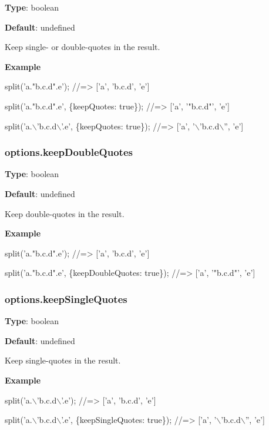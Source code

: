 {\bfseries Type}\+: {\ttfamily boolean}

{\bfseries Default}\+: {\ttfamily undefined}

Keep single-\/ or double-\/quotes in the result.

{\bfseries Example}


\begin{DoxyCode}
split('a."b.c.d".e');
//=> ['a', 'b.c.d', 'e']

split('a."b.c.d".e', \{keepQuotes: true\});
//=> ['a', '"b.c.d"', 'e']

split('a.\(\backslash\)'b.c.d\(\backslash\)'.e', \{keepQuotes: true\});
//=> ['a', '\(\backslash\)'b.c.d\(\backslash\)'', 'e']
\end{DoxyCode}


\subsubsection*{options.\+keep\+Double\+Quotes}

{\bfseries Type}\+: {\ttfamily boolean}

{\bfseries Default}\+: {\ttfamily undefined}

Keep double-\/quotes in the result.

{\bfseries Example}


\begin{DoxyCode}
split('a."b.c.d".e');
//=> ['a', 'b.c.d', 'e']

split('a."b.c.d".e', \{keepDoubleQuotes: true\});
//=> ['a', '"b.c.d"', 'e']
\end{DoxyCode}


\subsubsection*{options.\+keep\+Single\+Quotes}

{\bfseries Type}\+: {\ttfamily boolean}

{\bfseries Default}\+: {\ttfamily undefined}

Keep single-\/quotes in the result.

{\bfseries Example}


\begin{DoxyCode}
split('a.\(\backslash\)'b.c.d\(\backslash\)'.e');
//=> ['a', 'b.c.d', 'e']

split('a.\(\backslash\)'b.c.d\(\backslash\)'.e', \{keepSingleQuotes: true\});
//=> ['a', '\(\backslash\)'b.c.d\(\backslash\)'', 'e']
\end{DoxyCode}


